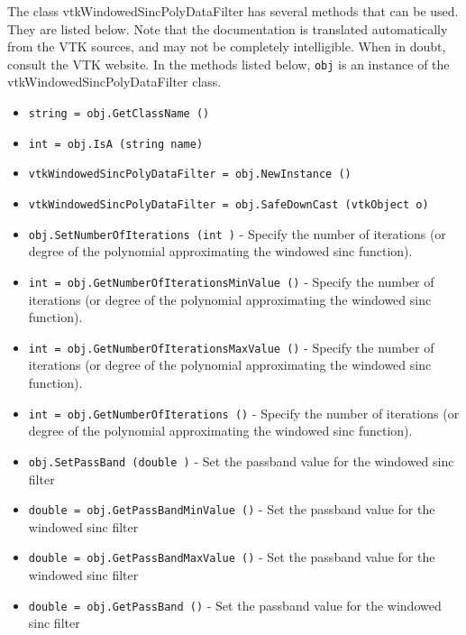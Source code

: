 The class vtkWindowedSincPolyDataFilter has several methods that can be used.
  They are listed below.
Note that the documentation is translated automatically from the VTK sources,
and may not be completely intelligible.  When in doubt, consult the VTK website.
In the methods listed below, \verb|obj| is an instance of the vtkWindowedSincPolyDataFilter class.
\begin{itemize}
\item  \verb|string = obj.GetClassName ()|

\item  \verb|int = obj.IsA (string name)|

\item  \verb|vtkWindowedSincPolyDataFilter = obj.NewInstance ()|

\item  \verb|vtkWindowedSincPolyDataFilter = obj.SafeDownCast (vtkObject o)|

\item  \verb|obj.SetNumberOfIterations (int )| -  Specify the number of iterations (or degree of the polynomial
 approximating the windowed sinc function).

\item  \verb|int = obj.GetNumberOfIterationsMinValue ()| -  Specify the number of iterations (or degree of the polynomial
 approximating the windowed sinc function).

\item  \verb|int = obj.GetNumberOfIterationsMaxValue ()| -  Specify the number of iterations (or degree of the polynomial
 approximating the windowed sinc function).

\item  \verb|int = obj.GetNumberOfIterations ()| -  Specify the number of iterations (or degree of the polynomial
 approximating the windowed sinc function).

\item  \verb|obj.SetPassBand (double )| -  Set the passband value for the windowed sinc filter

\item  \verb|double = obj.GetPassBandMinValue ()| -  Set the passband value for the windowed sinc filter

\item  \verb|double = obj.GetPassBandMaxValue ()| -  Set the passband value for the windowed sinc filter

\item  \verb|double = obj.GetPassBand ()| -  Set the passband value for the windowed sinc filter


\end{itemize}
